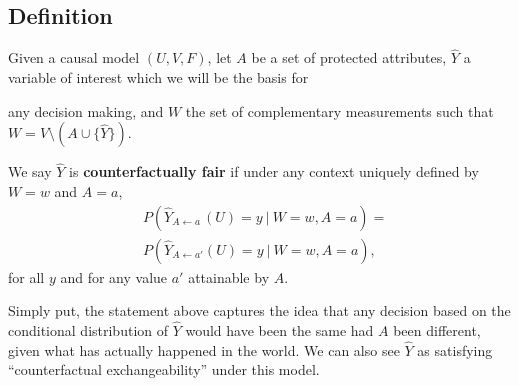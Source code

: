 \begin{figure}[th!]
\end{figure}


\subsection{Definition}
Given a causal model $(U, V, F)$, let $A$ be a set of protected
attributes, $\hat Y$ a variable of interest which we will be the basis for

any decision making, and $W$ the set of complementary measurements such that
$W= V \setminus ( A \cup \{\hat Y\})$.
\begin{define}
We say $\hat Y$ is {\bf counterfactually fair}
if under any context uniquely defined by $W = w$ and $A = a$,
  \label{eq:cf_definition}
\begin{align}
  &P(\hat Y_{A \leftarrow a\ }(U) = y\ |\ W = w, A = a)  =\nonumber\\ 
  &P(\hat Y_{A \leftarrow a'}(U) = y\ |\ W = w, A = a), 
\end{align}
for all $y$ and for any value $a'$ attainable by $A$.
\end{define}
Simply put,
the statement above captures the idea that any decision based on the
conditional distribution of $\hat Y$ would have been the same had $A$ been
different, given what has actually happened in the world.
We can also see $\hat Y$ as satisfying ``counterfactual exchangeability''
under this model.

